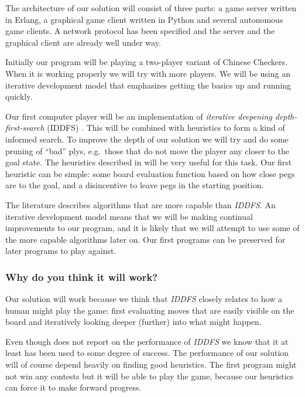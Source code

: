 \documentclass[a4paper,11pt]{article}
\begin{document}
The architecture of our solution will consist of three parts: a game
server written in Erlang, a graphical game client written in Python
and several autonomous game clients. A network protocol has been
specified and the server and the graphical client are already well
under way.

Initially our program will be playing a two-player variant of Chinese
Checkers. When it is working properly we will try with more players.
We will be using an iterative development model that emphasizes
getting the basics up and running quickly.

Our first computer player will be an implementation of \emph{iterative
  deepening depth-first-search} (IDDFS) \cite{aimodern}. This will be
combined with heuristics to form a kind of informed search. To improve
the depth of our solution we will try and do some pruning of ``bad''
plys, e.g.~those that do not move the player any closer to the goal
state. The heuristics described in \cite{ulfhake} will be very useful
for this task. Our first heuristic can be simple: some board
evaluation function based on how close pegs are to the goal, and a
disincentive to leave pegs in the starting position.

The literature describes algorithms that are more capable than
\emph{IDDFS}. An iterative development model means that we will be
making continual improvements to our program, and it is likely that we
will attempt to use some of the more capable algorithms later on. Our
first programs can be preserved for later programs to play against.

\subsubsection{Why do you think it will work?}%

Our solution will work because we think that \emph{IDDFS} closely
relates to how a human might play the game: first evaluating moves
that are easily visible on the board and iteratively looking deeper
(further) into what might happen.

Even though \cite{Huang:2001:SGP:378593.378708} does not report on the
performance of \emph{IDDFS} we know that it at least has been used to
some degree of success. The performance of our solution will of course
depend heavily on finding good heuristics. The first program might not
win any contests but it will be able to play the game, because our
heuristics can force it to make forward progress.
\end{document}
